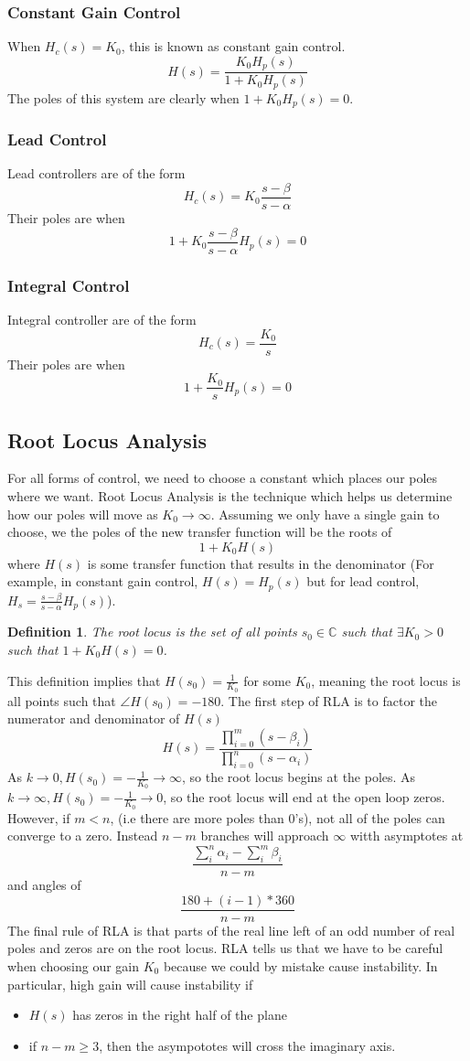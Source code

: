 \documentclass{article}
\newtheorem{definition}{Definition}
\begin{document}
\subsubsection{Constant Gain Control}
When $H_c(s) = K_0$, this is known as constant gain control.
$$H(s) = \frac{K_0H_p(s)}{1+K_0H_p(s)}$$
The poles of this system are clearly when $1+K_0H_p(s)=0$.
\subsubsection{Lead Control}
Lead controllers are of the form
$$H_c(s) = K_0\frac{s-\beta}{s-\alpha}$$
Their poles are when
$$1 + K_0\frac{s-\beta}{s-\alpha}H_p(s) = 0$$
\subsubsection{Integral Control}
Integral controller are of the form
$$H_c(s) = \frac{K_0}{s}$$
Their poles are when 
$$1 + \frac{K_0}{s}H_p(s) = 0$$
\subsection{Root Locus Analysis}
For all forms of control, we need to choose a constant which places our poles where we want. Root Locus Analysis
is the technique which helps us determine how our poles will move as $K_0\rightarrow \infty$.
Assuming we only have a single gain to choose, we the poles of the new transfer function will be the roots of
$$1 + K_0H(s)$$ where $H(s)$ is some transfer function that results in the denominator (For example, in constant gain control, $H(s) = H_p(s)$ but for
lead control, $H_s = \frac{s-\beta}{s-\alpha}H_p(s)$).
\begin{definition}
    The root locus is the set of all points $s_0\in \mathbb{C}$ such that $\exists K_0>0$ such that $1+K_0H(s)=0$.
\end{definition}
This definition implies that $H(s_0)=\frac{1}{K_0}$ for some $K_0$, meaning the root locus is all points such that $\angle H(s_0)=-180$\textdegree.
The first step of RLA is to factor the numerator and denominator of $H(s)$
$$H(s) = \frac{\prod_{i=0}^{m}{(s-\beta_i)}}{\prod_{i=0}^{n}{(s-\alpha_i)}}$$
As $k\rightarrow 0, H(s_0)=-\frac{1}{K_0}\rightarrow \infty$, so the root locus begins at the poles.
As $k\rightarrow \infty, H(s_0)=-\frac{1}{K_0}\rightarrow 0$, so the root locus will end at the open loop zeros.
However, if $m < n$, (i.e there are more poles than 0's), not all of the poles can converge to a zero.
Instead $n-m$ branches will approach $\infty$ witth asymptotes at
$$\frac{\sum_i^n\alpha_i-\sum_i^m\beta_i}{n-m}$$ and angles of
$$\frac{180 + (i-1)*360}{n-m}$$
The final rule of RLA is that parts of the real line left of an odd number of real poles and zeros are on the root locus.
RLA tells us that we have to be careful when choosing our gain $K_0$ because we could by mistake cause instability. In particular, high gain will cause instability if
\begin{itemize}
    \item $H(s)$ has zeros in the right half of the plane
    \item if $n-m \ge 3$, then the asympototes will cross the imaginary axis.
\end{itemize}
\end{document}
